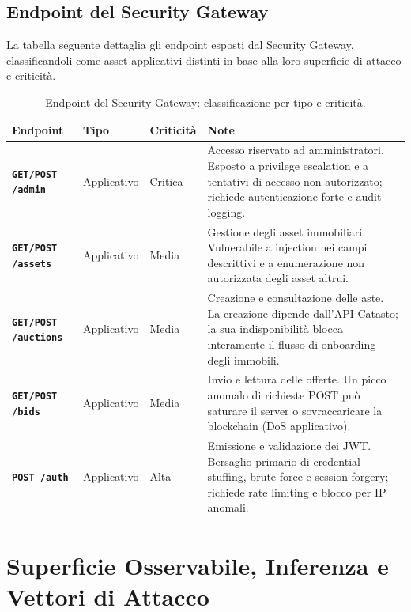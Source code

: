 \subsection{Endpoint del Security Gateway}

La tabella seguente dettaglia gli endpoint esposti dal Security Gateway, classificandoli
come asset applicativi distinti in base alla loro superficie di attacco e criticità.

\begin{table}[h]
\centering
\footnotesize
\renewcommand{\arraystretch}{1.4}
\begin{tabularx}{\textwidth}{>{\bfseries}p{3.2cm} p{2cm} p{1.6cm} X}
\toprule
\textbf{Endpoint} & \textbf{Tipo} & \textbf{Criticità} & \textbf{Note} \\
\midrule
\texttt{GET/POST /admin} & Applicativo & Critica &
    Accesso riservato ad amministratori. Esposto a privilege escalation e a tentativi di
    accesso non autorizzato; richiede autenticazione forte e audit logging. \\[4pt]
\texttt{GET/POST /assets} & Applicativo & Media &
    Gestione degli asset immobiliari. Vulnerabile a injection nei campi descrittivi e
    a enumerazione non autorizzata degli asset altrui. \\[4pt]
\texttt{GET/POST /auctions} & Applicativo & Media &
    Creazione e consultazione delle aste. La creazione dipende dall'API Catasto; la sua
    indisponibilità blocca interamente il flusso di onboarding degli immobili. \\[4pt]
\texttt{GET/POST /bids} & Applicativo & Media &
    Invio e lettura delle offerte. Un picco anomalo di richieste POST può saturare
    il server o sovraccaricare la blockchain (DoS applicativo). \\[4pt]
\texttt{POST /auth} & Applicativo & Alta &
    Emissione e validazione dei JWT. Bersaglio primario di credential stuffing, brute
    force e session forgery; richiede rate limiting e blocco per IP anomali. \\
\bottomrule
\end{tabularx}
\caption{Endpoint del Security Gateway: classificazione per tipo e criticità.}
\label{tab:endpoints}
\end{table}

\newpage

\section{Superficie Osservabile, Inferenza e Vettori di Attacco}


